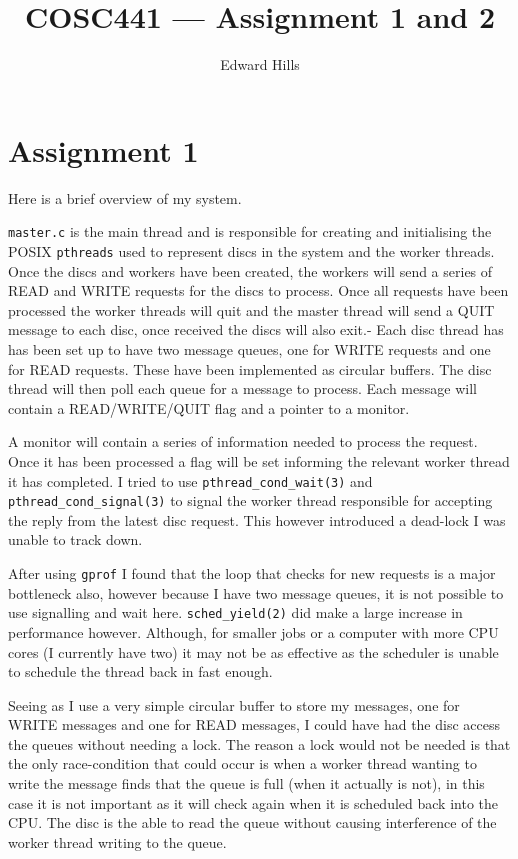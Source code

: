 \documentclass[12pt]{article}
\title{COSC441 --- Assignment 1 and 2}
\author{Edward Hills}
\date{}
\begin{document}
\vspace{-1cm}

\maketitle

\section*{Assignment 1}

Here is a brief overview of my system.

\texttt{master.c} is the main thread and is responsible for creating and initialising the POSIX \texttt{pthreads} used to represent discs in the system and the worker threads. Once the discs and workers have been created, the workers will send a series of READ and WRITE requests for the discs to process. Once all requests have been processed the worker threads will quit and the master thread will send a QUIT message to each disc, once received the discs will also exit.-
Each disc thread has has been set up to have two message queues, one for WRITE requests and one for READ requests. These have been implemented as circular buffers. The disc thread will then poll each queue for a message to process. Each message will contain a READ/WRITE/QUIT flag and a pointer to a monitor.

A monitor will contain a series of information needed to process the request. Once it has been processed a flag will be set informing the relevant worker thread it has completed. I tried to use \texttt{pthread\_cond\_wait(3)} and \texttt{pthread\_cond\_signal(3)} to signal the worker thread responsible for accepting the reply from the latest disc request. This however introduced a dead-lock I was unable to track down.

After using \texttt{gprof} I found that the loop that checks for new requests is a major bottleneck also, however because I have two message queues, it is not possible to use signalling and wait here. \texttt{sched\_yield(2)} did make a large increase in performance however. Although, for smaller jobs or a computer with more CPU cores (I currently have two) it may not be as effective as the scheduler is unable to schedule the thread back in fast enough.

Seeing as I use a very simple circular buffer to store my messages, one for WRITE messages and one for READ messages, I could have had the disc access the queues without needing a lock. The reason a lock would not be needed is that the only race-condition that could occur is when a worker thread wanting to write the message finds that the queue is full (when it actually is not), in this case it is not important as it will check again when it is scheduled back into the CPU. The disc is the able to read the queue without causing interference of the worker thread writing to the queue.
\end{document}
